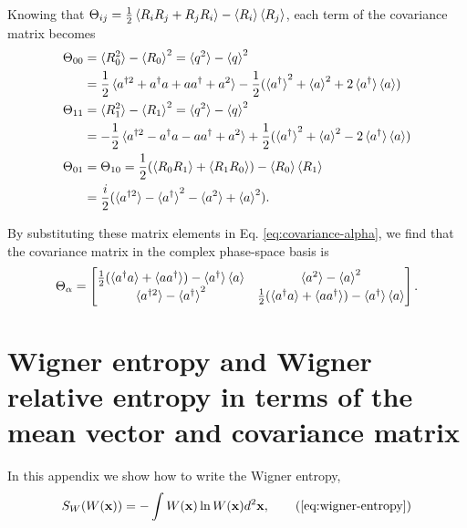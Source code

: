 \begin{apendicesenv}
\noindent Knowing that $\Theta_{ij} = \frac{1}{2} \braket{R_i R_j + R_j R_i} - \braket{R_i} \braket{R_j}$, each term of the covariance matrix becomes
\begin{align}
    \Theta_{00} &= \braket{R_0^2} - \braket{R_0}^2 = \braket{q^2} - \braket{q}^2 \nonumber\\
    &= \frac{1}{2} \braket{a^{\dagger 2} + a^\dagger a+ a a^\dagger + a^2 } - \frac{1}{2} (\braket{a^\dagger}^2 + \braket{a}^2 + 2 \braket{a^\dagger} \braket{a})\\
    \Theta_{11} &= \braket{R_1^2} - \braket{R_1}^2 = \braket{q^2} - \braket{q}^2 \nonumber\\
    &= -\frac{1}{2} \braket{a^{\dagger 2} - a^\dagger a - a a^\dagger + a^2 } + \frac{1}{2} (\braket{a^\dagger}^2 + \braket{a}^2 - 2 \braket{a^\dagger} \braket{a})\\
    \Theta_{01} &= \Theta_{10} = \frac{1}{2} (\braket{R_0 R_1} + \braket{R_1 R_0}) - \braket{R_0}\braket{R_1} \nonumber\\
    &= \frac{i}{2} (\braket{a^{\dagger 2}} - \braket{a^\dagger}^2 - \braket{a^2} + \braket{a}^2 ).
\end{align}

\noindent By substituting these matrix elements in Eq. \eqref{eq:covariance-alpha}, we find that the covariance matrix in the complex phase-space basis is 
\begin{equation}
    \Theta_\alpha = \begin{bmatrix}
        \frac{1}{2}(\braket{{a}^\dagger {a}} + \braket{{a} {a}^\dagger}) - \braket{{a}^\dagger} \braket{{a}} & \braket{{a}^2} - \braket{{a}}^2\\
        \braket{{a}^{\dagger 2}} - \braket{{a}^\dagger}^2 & \frac{1}{2}(\braket{{a}^\dagger {a}} + \braket{{a} {a}^\dagger}) - \braket{{a}^\dagger} \braket{{a}}
    \end{bmatrix}.
\end{equation}





\chapter{Wigner entropy and Wigner relative entropy in terms of the mean vector and covariance matrix}
\label{apx:K-wigner}

In this appendix we show how to write the Wigner entropy,
\begin{equation}
    S_W(W(\mathbf{x})) = -\int W(\mathbf{x}) \ln  W(\mathbf{x}) d^2 \mathbf{x},
    \tag{\ref{eq:wigner-entropy}}
\end{equation}


\end{apendicesenv}
